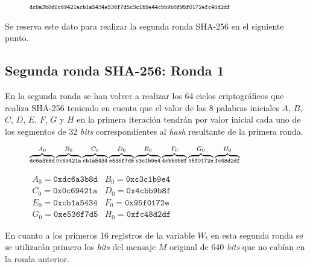 \documentclass{article}
\begin{document}
        \begin{figure}[H]
        \centering
            $\scriptsize{\texttt{dc6a3b8d0c69421acb1a5434e536f7d5c3c1b9e44cbb9b8f95f0172efc48d2df}}$
        \end{figure}
        Se reserva este dato para realizar la segunda ronda SHA-256 en el siguiente punto.
        
        \subsection{Segunda ronda SHA-256: Ronda 1}
        En la segunda ronda se han volver a realizar los 64 ciclos criptográficos que realiza SHA-256 teniendo en cuenta que el valor de las 8 palabras iniciales $A$, $B$, $C$, $D$, $E$, $F$, $G$ y $H$ en la primera iteración tendrán por valor inicial cada uno de los segmentos de 32 \textit{bits} correspondientes al \textit{hash} resultante de la primera ronda.
        
        \begin{figure}[H]
        \centering
            $\scriptsize{\overbrace{\texttt{dc6a3b8d}}^{A_{0}}\overbrace{\texttt{0c69421a}}^{B_{0}}\overbrace{\texttt{cb1a5434}}^{C_{0}}\overbrace{\texttt{e536f7d5}}^{D_{0}}\overbrace{\texttt{c3c1b9e4}}^{E_{0}}\overbrace{\texttt{4cbb9b8f}}^{F_{0}}\overbrace{\texttt{95f0172e}}^{G_{0}}\overbrace{\texttt{fc48d2df}}^{H_{0}}}$
        \end{figure}
        
        \begin{figure}[H]
        \centering
            $\begin{array}{rr}
                A_{0} = \texttt{0xdc6a3b8d} & B_{0} = \texttt{0xc3c1b9e4} \\
                C_{0} = \texttt{0x0c69421a} & D_{0} = \texttt{0x4cbb9b8f} \\
                E_{0} = \texttt{0xcb1a5434} & F_{0} = \texttt{0x95f0172e} \\
                G_{0} = \texttt{0xe536f7d5} & H_{0} = \texttt{0xfc48d2df}
            \end{array}$
        \end{figure}
        
        En cuanto a los primeros 16 registros de la variable $W_t$ en esta segunda ronda se se utilizarán primero los \textit{bits} del mensaje $M$ original de 640 \textit{bits} que no cabían en la ronda anterior.
        
        \vspace{3mm}
        
\end{document}
